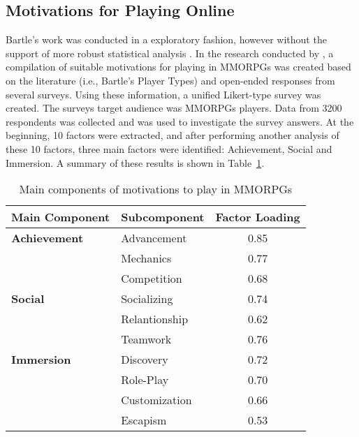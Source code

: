 \subsection{Motivations for Playing Online}
\label{sec:motivations_for_playing_online}

Bartle's work was conducted in a exploratory fashion, however without the support of more robust statistical analysis \cite{yee2006motivations}. In the research conducted by \citeauthor{yee2006motivations}, a compilation of suitable motivations for playing in MMORPGs was created based on the literature (i.e., Bartle’s Player Types) and open-ended responses from several surveys. Using these information, a unified Likert-type survey was created. The surveys target audience was MMORPGs players. Data from 3200 respondents was collected and  was used to investigate the survey answers. At the beginning, 10 factors were extracted, and after performing another analysis of these 10 factors, three main factors were identified: Achievement, Social and Immersion. A summary of these results is shown in Table~\ref{tab:motivations_for_play_yee}.

\begin{table}[]
\centering
\caption{Main components of motivations to play in MMORPGs \cite{yee2006motivations}}
\label{tab:motivations_for_play_yee}
\begin{tabular}{@{}llc@{}}
\toprule
\textbf{Main Component} & \textbf{Subcomponent} & \multicolumn{1}{l}{\textbf{Factor Loading}} \\ \midrule
\textbf{Achievement} & Advancement & 0.85 \\
 & Mechanics & 0.77 \\
 & Competition & 0.68 \\
\textbf{Social} & Socializing & 0.74 \\
 & Relantionship & 0.62 \\
 & Teamwork & 0.76 \\
\textbf{Immersion} & Discovery & 0.72 \\
 & Role-Play & 0.70 \\
 & Customization & 0.66 \\
 & Escapism & 0.53 \\ \bottomrule
\end{tabular}
\end{table}

